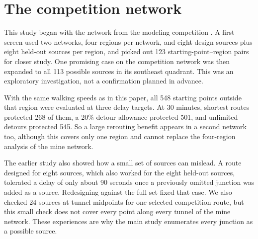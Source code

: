 \documentclass[11pt,a4paper]{article}
\begin{document}
\section{The competition network}\label{app:competition}
This study began with the network from the modeling competition \cite{cumcm}. A first screen used two networks, four regions per network, and eight design sources plus eight held-out sources per region, and picked out 123 starting-point--region pairs for closer study. One promising case on the competition network was then expanded to all 113 possible sources in its southeast quadrant. This was an exploratory investigation, not a confirmation planned in advance.

With the same walking speeds as in this paper, all 548 starting points outside that region were evaluated at three delay targets. At 30 minutes, shortest routes protected 268 of them, a 20\% detour allowance protected 501, and unlimited detours protected 545. So a large rerouting benefit appears in a second network too, although this covers only one region and cannot replace the four-region analysis of the mine network.

The earlier study also showed how a small set of sources can mislead. A route designed for eight sources, which also worked for the eight held-out sources, tolerated a delay of only about 90 seconds once a previously omitted junction was added as a source. Redesigning against the full set fixed that case. We also checked 24 sources at tunnel midpoints for one selected competition route, but this small check does not cover every point along every tunnel of the mine network. These experiences are why the main study enumerates every junction as a possible source.
\end{document}
